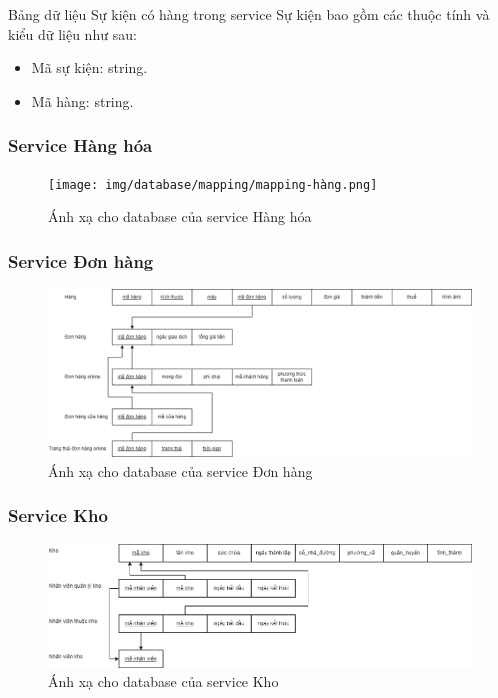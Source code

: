 Bảng dữ liệu Sự kiện có hàng trong service Sự kiện bao gồm các thuộc tính và kiểu dữ liệu như sau:
\begin{itemize}
    \item Mã sự kiện: string.
    \item Mã hàng: string.
\end{itemize}

\subsubsection{Service Hàng hóa}
\begin{figure}[!htp]
    \begin{center}
        \texttt{[image: img/database/mapping/mapping-hàng.png]}
        \newline
        \caption{Ánh xạ cho database của service Hàng hóa}
    \end{center}
\end{figure}

\subsubsection{Service Đơn hàng}
\begin{figure}[!htp]
    \begin{center}
        \includegraphics[width=1\textwidth]{img/database/mapping/mapping-đơnhàng.png}
        \newline
        \caption{Ánh xạ cho database của service Đơn hàng}
    \end{center}
\end{figure}

\subsubsection{Service Kho}
\begin{figure}[!htp]
    \begin{center}
        \includegraphics[width=1\textwidth]{img/database/mapping/mapping-kho.png}
        \newline
        \caption{Ánh xạ cho database của service Kho}
    \end{center}
\end{figure}

